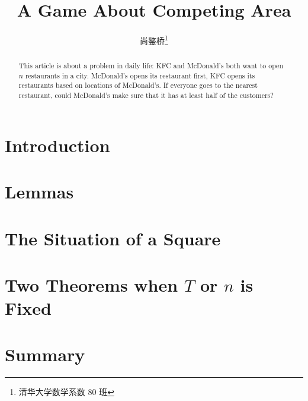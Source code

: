 \documentclass[twoside]{article}
\begin{document}
\title{A Game About Competing Area}
\author{尚鉴桥\footnote{清华大学数学系数 80 班}}

\begin{abstract}
	This article is about a problem in daily life: 
	KFC and McDonald's both want to open $n$ restaurants in a city. 
	McDonald's opens its restaurant first, 
	KFC opens its restaurants based on locations of McDonald's. 
	If everyone goes to the nearest restaurant, 
	could McDonald's make sure that it has at least half of the customers? 
\end{abstract}

\tableofcontents
\bigskip

\section{Introduction}



\section{Lemmas}



\section{The Situation of a Square}



\section{Two Theorems when \texorpdfstring{$T$}{T} or \texorpdfstring{$n$}{n} is Fixed}



\section{Summary}


\end{document}
